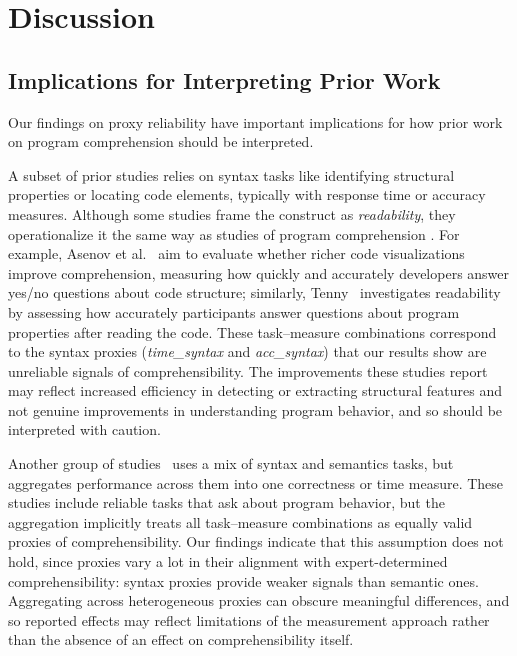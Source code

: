  
\section{Discussion}
\label{sec:discussion}

\subsection{Implications for Interpreting Prior Work}
\label{sec:implications}

Our findings on proxy reliability have important implications for how prior work on
program comprehension should be interpreted.




A subset of prior studies relies on syntax tasks like identifying structural properties or locating
code elements, typically with response time or accuracy
measures. Although some studies frame the construct as
\emph{readability}, they operationalize it the same way as studies of program
comprehension \cite{Wyrich:ACS23}.
For example, Asenov et al.~\cite{33-29} aim to evaluate whether richer code
visualizations improve comprehension, measuring how quickly and
accurately developers answer yes/no questions about code structure;
similarly, Tenny~\cite{33-4} investigates readability by assessing how accurately
participants answer questions about program properties after reading
the code.
These task–measure combinations correspond to the syntax
proxies (\emph{time\_syntax} and \emph{acc\_syntax}) that our results show
are unreliable signals of comprehensibility.
The improvements these studies report may reflect increased efficiency in detecting or extracting
structural features and not genuine improvements in
understanding program behavior, and so should be interpreted
with caution.

Another group of studies~\cite{33-15,penningtonModel,S75,S4} uses a mix of syntax and semantics tasks,
but aggregates performance across them into
one correctness or time measure. These studies include reliable tasks that ask about program behavior, but the
aggregation implicitly treats all task–measure combinations as
equally valid proxies of comprehensibility. Our findings indicate
that this assumption does not hold, since proxies vary a lot in
their alignment with expert-determined comprehensibility:
syntax proxies provide weaker signals than semantic ones.
Aggregating across heterogeneous proxies can obscure meaningful differences, and
so reported effects may reflect limitations of the
measurement approach rather than the absence of an effect on
comprehensibility itself.

